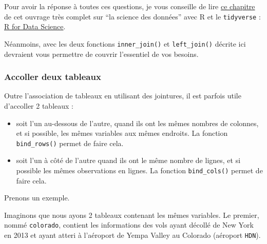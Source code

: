\documentclass[a4paperpaper,]{article}
\newenvironment{Shaded}{\begin{snugshade}}{\end{snugshade}}
\newcommand{\KeywordTok}[1]{\textcolor[rgb]{0.13,0.29,0.53}{\textbf{#1}}}
\newcommand{\StringTok}[1]{\textcolor[rgb]{0.31,0.60,0.02}{#1}}
\newcommand{\OperatorTok}[1]{\textcolor[rgb]{0.81,0.36,0.00}{\textbf{#1}}}
\newcommand{\NormalTok}[1]{#1}
\providecommand{\tightlist}{%
  \setlength{\itemsep}{0pt}\setlength{\parskip}{0pt}}
\theoremstyle{definition}
\theoremstyle{definition}
\theoremstyle{definition}
\theoremstyle{remark}
\begin{document}
Pour avoir la réponse à toutes ces questions, je vous conseille de lire
\href{http://r4ds.had.co.nz/relational-data.html}{ce chapitre} de cet
ouvrage très complet sur ``la science des données'' avec R et le
\texttt{tidyverse} : \href{http://r4ds.had.co.nz}{R for Data Science}.

Néanmoins, avec les deux fonctions \texttt{inner\_join()} et
\texttt{left\_join()} décrite ici devraient vous permettre de couvrir
l'essentiel de vos besoins.

\subsubsection{Accoller deux tableaux}\label{accoller-deux-tableaux}

Outre l'association de tableaux en utilisant des jointures, il est
parfois utile d'accoller 2 tableaux :

\begin{itemize}
\tightlist
\item
  soit l'un au-dessous de l'autre, quand ils ont les mêmes nombres de
  colonnes, et si possible, les mêmes variables aux mêmes endroits. La
  fonction \texttt{bind\_rows()} permet de faire cela.
\item
  soit l'un à côté de l'autre quand ils ont le même nombre de lignes, et
  si possible les mêmes observations en lignes. La fonction
  \texttt{bind\_cols()} permet de faire cela.
\end{itemize}

Prenons un exemple.

Imaginons que nous ayons 2 tableaux contenant les mêmes variables. Le
premier, nommé \texttt{colorado}, contient les informations des vols
ayant décollé de New York en 2013 et ayant atteri à l'aéroport de Yempa
Valley au Colorado (aéroport \texttt{HDN}).

\begin{Shaded}
\end{Shaded}
\end{document}
